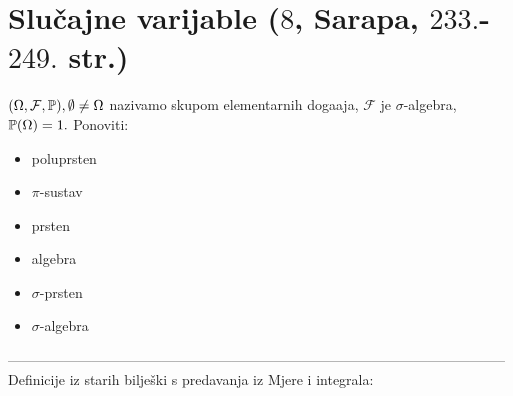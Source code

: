 \documentclass{article}
\begin{document}
\newpage
\tableofcontents
\newpage
\section{Slučajne varijable (\textsection \(8\), Sarapa, \(233.\)-\(249.\) str.)}
\((\Omega,\mathcal F,\Bbb P),\emptyset\ne\Omega\) nazivamo skupom elementarnih doga\dj{}aja, \(\mathcal F\) je \(\sigma\)-algebra, \(\Bbb P(\Omega)=1.\)\newline
Ponoviti:
\begin{itemize}
    \item[\ding{113}] poluprsten
    \item[\ding{113}] \(\pi\)-sustav
    \item[\ding{113}] prsten
    \item[\ding{113}] algebra
    \item[\ding{113}] \(\sigma\)-prsten
    \item[\ding{113}] \(\sigma\)-algebra
\end{itemize}
-----------------------------------------------------------------------------------------------------------\newline\newline
Definicije iz starih bilješki s predavanja iz Mjere i integrala:
\end{document}
